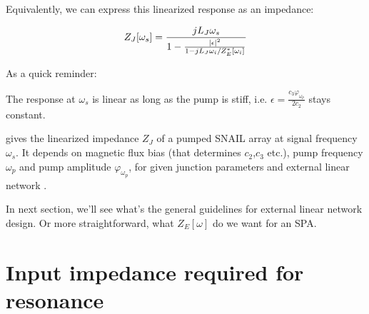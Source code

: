 \documentclass{article}
\begin{document}
Equivalently, we can express this linearized response as an impedance: 

\begin{equation}\label{eq:ZJ}
	Z_J[\omega_s] = \frac{j L_J \omega_s }{1 - \frac{\left | \epsilon \right |^2}{1 - jL_J \omega_i/Z_E^*[\omega_i]}}
\end{equation}

As a quick reminder: 

The response at $\omega_s$ is linear as long as the pump is stiff, i.e. $\epsilon = \frac{c_3\varphi_{\omega_p}}{2c_2}$ stays constant. 

 gives the linearized impedance $Z_J$ of a pumped SNAIL array at signal frequency $\omega_s$. It depends on magnetic flux bias (that determines $c_2$,$c_3$ etc.), pump frequency $\omega_p$ and pump amplitude $\varphi_{\omega_p}$, for given junction parameters and external linear network . 

In next section, we'll see what's the general guidelines for external linear network design. Or more straightforward, what $Z_E[\omega]$ do we want for an SPA. 

\section{Input impedance required for resonance}\label{appen:mode}





\end{document}
